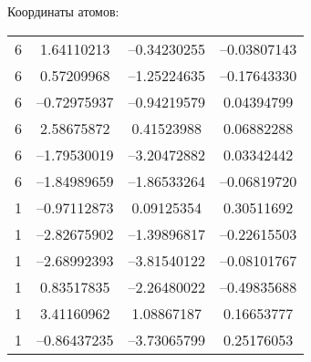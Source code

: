 {Координаты атомов:
\begin{center}
\begin{tabular}{cccc}
   6  &   1.64110213 & --0.34230255 & --0.03807143\\
   6  &   0.57209968 & --1.25224635 & --0.17643330\\
   6  &  --0.72975937 & --0.94219579 &  0.04394799\\
   6  &   2.58675872 &  0.41523988 &  0.06882288\\
   6  &  --1.79530019 & --3.20472882 &  0.03342442\\
   6  &  --1.84989659 & --1.86533264 & --0.06819720\\
   1  &  --0.97112873 &  0.09125354 &  0.30511692\\
   1  &  --2.82675902 & --1.39896817 & --0.22615503\\
   1  &  --2.68992393 & --3.81540122 & --0.08101767\\
   1  &   0.83517835 & --2.26480022 & --0.49835688\\
   1  &   3.41160962 &  1.08867187 &  0.16653777\\
   1  &  --0.86437235 & --3.73065799 &  0.25176053\\
 \end{tabular}
\end{center}

}
